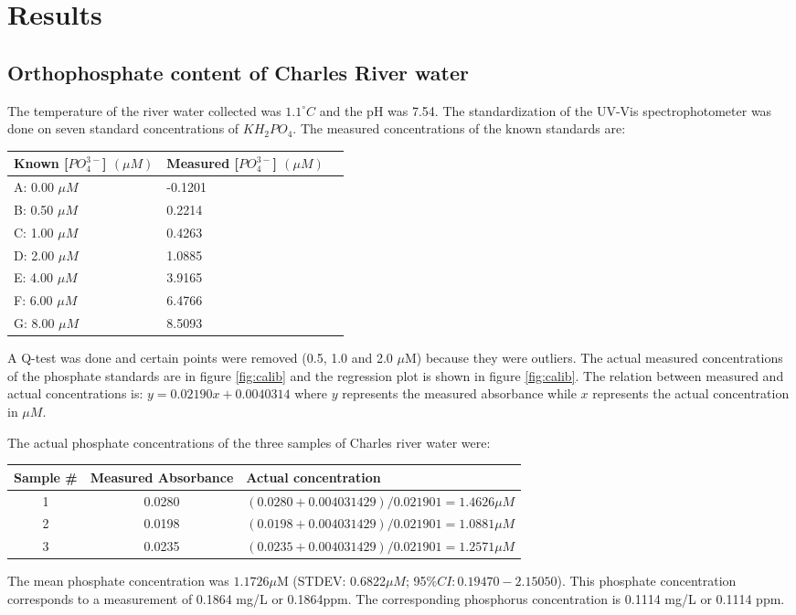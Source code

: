 \section{Results}
\subsection{Orthophosphate content of Charles River water}
The temperature of the river water collected was $1.1^{\circ}C$ and the pH was 7.54. 
The standardization of the UV-Vis spectrophotometer was done on seven standard concentrations of $KH_2PO_4$. The measured concentrations of the known standards are:
\begin{center}
    \begin{tabular}{ | p{3cm} | p{3cm} | p{3cm} |}
    \hline
    Known [$PO_4^{3-}$] $(\mu M)$ & Measured [$PO_4^{3-}$] $(\mu M)$ \\ \hline
     A: 0.00 $\mu M$ & -0.1201 \\ \hline
     B: 0.50 $\mu M$ & 0.2214 \\ \hline
     C: 1.00 $\mu M$ & 0.4263 \\ \hline
     D: 2.00 $\mu M$ & 1.0885 \\ \hline
     E: 4.00 $\mu M$ & 3.9165 \\ \hline
     F: 6.00 $\mu M$ & 6.4766 \\ \hline
     G: 8.00 $\mu M$ & 8.5093 \\ \hline
	\end{tabular}
\end{center}
A Q-test was done and certain points were removed (0.5, 1.0 and 2.0 $\mu$M) because they were outliers. The actual measured concentrations of the phosphate standards are in figure \ref{fig:calib} and the regression plot is shown in figure \ref{fig:calib}. The relation between measured and actual concentrations is: $y = 0.02190x + 0.0040314$ where $y$ represents the measured absorbance while $x$ represents the actual concentration in $\mu M$. 

The actual phosphate concentrations of the three samples of Charles river water were: 
\begin{center}
    \begin{tabular}{ | c | c | l |}
    \hline
    Sample \# & Measured Absorbance & Actual concentration\\ \hline
    1 & 0.0280 & $(0.0280 + 0.004031429)/0.021901 = 1.4626 \mu M$\\ \hline
    2 & 0.0198 & $(0.0198 + 0.004031429)/0.021901 = 1.0881 \mu M$\\ \hline
    3 & 0.0235 & $(0.0235 + 0.004031429)/0.021901 = 1.2571 \mu M$\\ \hline
    \end{tabular}
\end{center}
The mean phosphate concentration was $1.1726\mu $M (STDEV: 0.6822$\mu M$; 95\%$ CI: 0.19470-2.15050$). This phosphate concentration corresponds to a measurement of 0.1864 mg/L or 0.1864ppm. The corresponding phosphorus concentration is 0.1114 mg/L or 0.1114 ppm.

